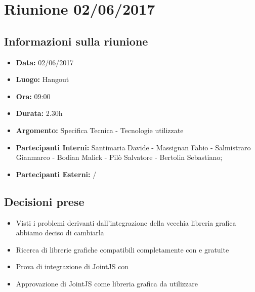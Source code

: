 \section{Riunione 02/06/2017}
  \subsection{Informazioni sulla riunione}
    \begin{itemize}
      \item \textbf{Data: }02/06/2017
      \item \textbf{Luogo: }Hangout
      \item \textbf{Ora: }09:00
      \item \textbf{Durata: }2.30h
      \item \textbf{Argomento: }Specifica Tecnica - Tecnologie utilizzate
      \item \textbf{Partecipanti Interni: }Santimaria Davide - Massignan Fabio - Salmistraro Gianmarco - Bodian Malick - Pilò Salvatore - Bertolin Sebastiano;
      \item \textbf{Partecipanti Esterni: }/
    \end{itemize}
  \subsection{Decisioni prese}
		\begin{itemize}
			\item Visti i problemi derivanti dall'integrazione della vecchia libreria grafica abbiamo deciso di cambiarla
      \item Ricerca di librerie grafiche compatibili completamente con  e gratuite
      \item Prova di integrazione di JointJS con 
      \item Approvazione di JointJS come libreria grafica da utilizzare
		\end{itemize}
